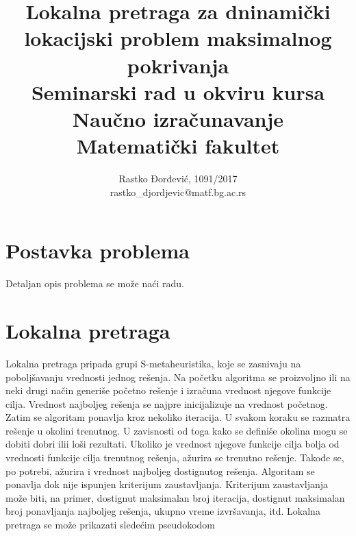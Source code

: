 \documentclass[a4paper]{article}
\begin{document}
\title{Lokalna pretraga za dninamički lokacijski problem maksimalnog pokrivanja\\ \small{Seminarski rad u okviru kursa\\Naučno izračunavanje\\ Matematički fakultet}}

\author{Rastko Đorđević, 1091/2017\\ rastko\_djordjevic@matf.bg.ac.rs}
\maketitle


\tableofcontents

\newpage



\section{Postavka problema}

Detaljan opis problema se može naći radu\cite{main_paper}.

\section{Lokalna pretraga}

Lokalna pretraga pripada grupi S-metaheuristika, koje se zasnivaju na poboljšavanju vrednosti jednog
rešenja. Na početku algoritma se proizvoljno ili na neki drugi način generiše početno rešenje i izračuna vrednost njegove funkcije cilja. Vrednost najboljeg rešenja se najpre inicijalizuje na vrednost početnog. Zatim se
algoritam ponavlja kroz nekoliko iteracija. U svakom koraku se razmatra rešenje u okolini trenutnog. U zavisnosti od toga kako se definiše okolina mogu se dobiti dobri ilii loši rezultati. Ukoliko je vrednost njegove funkcije cilja bolja od vrednosti funkcije cilja trenutnog rešenja, ažurira se trenutno
rešenje. Takođe se, po potrebi, ažurira i vrednost najboljeg dostignutog rešenja. Algoritam se ponavlja
dok nije ispunjen kriterijum zaustavljanja. Kriterijum zaustavljanja može biti, na primer, dostignut maksimalan broj iteracija, dostignut maksimalan broj ponavljanja najboljeg rešenja, ukupno vreme izvršavanja,
itd. Lokalna pretraga se može prikazati sledećim pseudokodom
\end{document}
